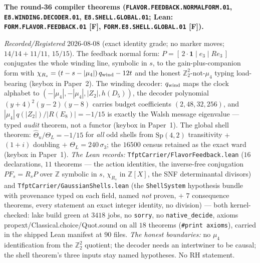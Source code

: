 \documentclass[11pt,a4paper]{article}
\newcommand{\Z}{\mathbb Z}
\begin{document}
\par\smallskip\noindent\textbf{The round-36 compiler theorems
(\texttt{FLAVOR.FEEDBACK.\allowbreak NORMALFORM.01},
\texttt{E8.WINDING.\allowbreak DECODER.01},
\texttt{E8.SHELL.GLOBAL.01}; Lean:
\texttt{FORM.FLAVOR.\allowbreak FEEDBACK.01} [F],
\texttt{FORM.E8.SHELL.\allowbreak GLOBAL.01} [F]).}
{\sloppy
\emph{Recorded/Registered} 2026-08-08 (exact identity grade; no
marker moves;  $14/14 +
11/11$,  $15/15$).  The
feedback normal form: $P = [\,2\cdot\mathbf 1 \mid e_3 \mid
R e_3\,]$ conjugates the whole winding line, symbolic in $s$,
to the gain-plus-companion form with $\chi_{R_s} = (t - s -
|\mu_4|)\,q_{\rm wind} - 12t$ and the honest $\Z_2^2$-not-$\mu_4$
typing load-bearing (keybox in Paper~2).  The winding decoder:
$q_{\rm wind}$ maps the clock alphabet to
$(-|\mu_4|,-|\mu_4|,|Z_2|,h(D_5))$, the decoder polynomial
$(y{+}4)^2(y{-}2)(y{-}8)$ carries budget coefficients
$(2,48,32,256)$, and $|\mu_4|\,q(|Z_2|)/|R(E_8)| = -1/15$ is
exactly the Walsh message eigenvalue --- typed \emph{audit}
theorem, not a functor (keybox in Paper~1).  The global shell
theorem: $\hat\Theta_u/\Theta_L = -1/15$ for \emph{all} odd
shells from $\mathrm{Sp}(4,2)$ transitivity $+$ $(1{+}i)$
doubling $+$ $\Theta_L = 240\,\sigma_3$; the $16500$ census
retained as the exact ward (keybox in Paper~1).  \emph{The Lean
records:} \texttt{TfptCarrier/FlavorFeedback.lean} ($16$
declarations, $11$ theorems --- the action identities, the
inverse-free conjugation $PF_s = R_sP$ over $\Z$ symbolic in
$s$, $\chi_{R_s}$ in $\Z[X]$, the SNF determinantal divisors)
and \texttt{TfptCarrier/GaussianShells.lean} (the
\texttt{ShellSystem} hypothesis bundle with provenance typed on
each field, named \emph{not} proven, $+$ $7$ consequence
theorems, every statement an exact integer identity, no
division) --- both kernel-checked: lake build green at $3418$
jobs, no \texttt{sorry}, no \texttt{native\_decide}, axioms
propext/Classical.choice/Quot.sound on all $18$ theorems
(\texttt{\#print axioms}), carried in the shipped Lean manifest
at $90$ files.  \emph{The honest boundaries:} no $\mu_4$
identification from the $\Z_2^2$ quotient; the decoder needs an
intertwiner to be causal; the shell theorem's three inputs stay
named hypotheses.  No RH statement.\par}
\end{document}
